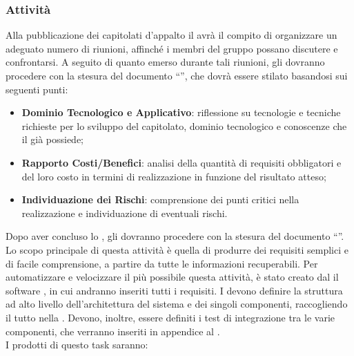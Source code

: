 \subsubsection{Attività}
Alla pubblicazione dei capitolati d'appalto il \rRP avrà il compito di organizzare un adeguato numero di riunioni, affinché i membri del gruppo possano discutere e confrontarsi. A seguito di quanto emerso durante tali riunioni, gli \rAs dovranno procedere con la stesura del documento ``\SF'', che dovrà essere stilato basandosi sui seguenti punti:
\begin{itemize}
\item \textbf{Dominio Tecnologico e Applicativo}: riflessione su tecnologie e tecniche richieste per lo sviluppo del capitolato, dominio tecnologico e conoscenze che il  già possiede;
\item \textbf{Rapporto Costi/Benefici}: analisi della quantità di requisiti obbligatori e del loro costo in termini di realizzazione in funzione del risultato atteso;
\item \textbf{Individuazione dei Rischi}: comprensione dei punti critici nella realizzazione e individuazione di eventuali rischi.
\end{itemize}
Dopo aver concluso lo \SF, gli \rAs dovranno procedere con la stesura del documento ``\AR''.
Lo scopo principale di questa attività è quella di produrre dei requisiti semplici e di facile comprensione, a partire da tutte le informazioni recuperabili. Per automatizzare e velocizzare il più possibile questa attività, è stato creato dal  il software \pragmadb, in cui andranno inseriti tutti i requisiti.
\label{normeprog}
I \rPs devono definire la struttura ad alto livello dell'architettura del sistema e dei singoli componenti, raccogliendo il tutto nella \ST. Devono, inoltre, essere definiti i test di integrazione tra le varie componenti, che verranno inseriti in appendice al \PQ. \\
I prodotti di questo task saranno:
